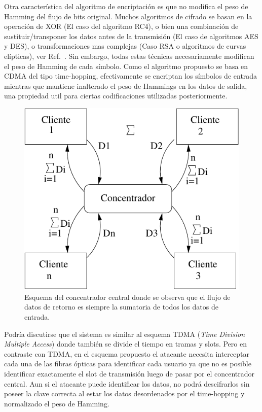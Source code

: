 Otra característica del algoritmo de encriptación es que no modifica el peso de Hamming del flujo de bits original. Muchos algoritmos de cifrado se basan en la operación de XOR (El caso del algoritmo RC4), o bien una combinación de sustituir/transponer los datos antes de la transmisión (El caso de algoritmos AES y DES), o transformaciones mas complejas (Caso RSA o algoritmos de curvas elípticas), ver Ref.~\cite{Menezes:1996:HAC:548089}.
Sin embargo, todas estas técnicas necesariamente modifican el peso de Hamming de cada símbolo. %
Como el algoritmo propuesto se basa en CDMA del tipo time-hopping, efectivamente se encriptan los símbolos de entrada mientras que mantiene inalterado el peso de Hammings en los datos de salida, una propiedad util para ciertas codificaciones utilizadas posteriormente. %

\begin{figure}[t]
  \centering
  \includegraphics[width=0.5 \textwidth]{graphs/concentrador} 
  \caption{Esquema del concentrador central donde se observa que el flujo de datos de retorno es siempre la sumatoria de todos los datos de entrada.}
  \label{fig_use}
\end{figure}

Podría discutirse que el sistema es similar al esquema TDMA (\textit{Time Division Multiple Access}) donde también se divide el tiempo en tramas y slots. Pero en contraste con TDMA, en el esquema propuesto el atacante necesita interceptar cada una de las fibras ópticas para identificar cada usuario ya que no es posible identificar exactamente el slot de transmisión luego de pasar por el concentrador central. Aun si el atacante puede identificar los datos, no podrá descifrarlos sin poseer la clave correcta al estar los datos desordenados por el time-hopping y normalizado el peso de Hamming.

